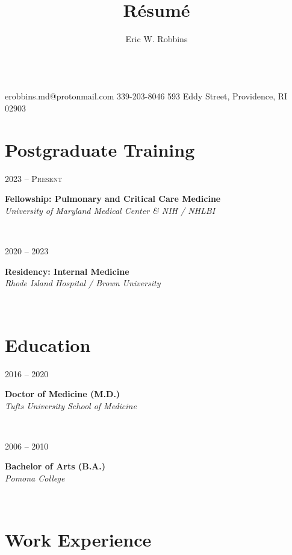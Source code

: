 \documentclass{article}
\title{R\'esum\'e}
\author{Eric W. Robbins}
\date{}
\makeatletter
\newcommand\colleft{.20}
\newcommand\colright{.75}
\newcommand\mohan{Mohan Thanikachalam, MD}
\newcommand{\entryfour}[4]
	{
		\begin{minipage}[t]{\colleft\textwidth}
		\hfill \textsc{#1}
		\end{minipage}
		\hfill\vline\hfill
		\begin{minipage}[t]{\colright\textwidth}
		{\bf#2}\\
		\textit{#3}
		\footnotesize{#4}
		\end{minipage}\\
		\entryvspace
	}%
\newcommand{\entryvspace}{\vspace{0.5em}}
\newcommand{\fellowship}{University of Maryland Medical Center \& NIH / NHLBI}
\newcommand{\residency}{Rhode Island Hospital / Brown University}
\newcommand{\medschool}{Tufts University School of Medicine}
\newcommand{\undergrad}{Pomona College}
\newcommand{\cphone}{339-203-8046}
\newcommand{\address}{593 Eddy Street, Providence, RI 02903}
\newcommand{\email}{erobbins.md@protonmail.com}
\renewcommand{\maketitle}{
\begin{center}
	{\huge\bfseries\theauthor}
	\vspace{0.25em}\\
	\email
	\hspace{1em}\vline \hspace{1em}%
	\cphone
	\hspace{1em}\vline \hspace{1em}
	\address
\end{center}
}
\makeatother
\begin{document}
	\maketitle
	
		\section*{Postgraduate Training}
	\entryfour{2023 -- Present}
	{Fellowship: Pulmonary and Critical Care Medicine}
	{\fellowship}
	{}
	
	\entryfour{2020 -- 2023}
	{Residency: Internal Medicine}
	{\residency}
	{}
	
	\section*{Education}
		\entryfour{2016 -- 2020}
			{Doctor of Medicine (M.D.)}
			{\medschool}
			{}%
			
		\entryfour{2006 -- 2010}
		{Bachelor of Arts (B.A.)}
		{\undergrad}
		{}%

	\section*{Work Experience}

		
\end{document}
